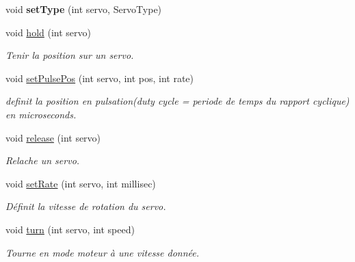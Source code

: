 \begin{DoxyCompactItemize}
\mbox{\label{classServoDriver_a5ca0f58290fa29ae484fe4a5077a1c8e}} 
void {\bfseries set\+Type} (int servo, Servo\+Type)
\item 
\mbox{\label{classServoDriver_af580283b3d1765c9a27276e9a870cf88}} 
void \hyperlink{classServoDriver_af580283b3d1765c9a27276e9a870cf88}{hold} (int servo)
\begin{DoxyCompactList}\small\item\em Tenir la position sur un servo. \end{DoxyCompactList}\item 
\mbox{\label{classServoDriver_a054705e6b04674b45aa9dd39e68a1b1c}} 
void \hyperlink{classServoDriver_a054705e6b04674b45aa9dd39e68a1b1c}{set\+Pulse\+Pos} (int servo, int pos, int rate)
\begin{DoxyCompactList}\small\item\em definit la position en pulsation(duty cycle = periode de temps du rapport cyclique) en microseconds. \end{DoxyCompactList}\item 
\mbox{\label{classServoDriver_aa1040b0db7ed851aec70a122301fe665}} 
void \hyperlink{classServoDriver_aa1040b0db7ed851aec70a122301fe665}{release} (int servo)
\begin{DoxyCompactList}\small\item\em Relache un servo. \end{DoxyCompactList}\item 
\mbox{\label{classServoDriver_a27d45f075f5fb2333937ab253a8cce6c}} 
void \hyperlink{classServoDriver_a27d45f075f5fb2333937ab253a8cce6c}{set\+Rate} (int servo, int millisec)
\begin{DoxyCompactList}\small\item\em Définit la vitesse de rotation du servo. \end{DoxyCompactList}\item 
\mbox{\label{classServoDriver_ad68ebde8a710451c8fea2cd03cfa4bc0}} 
void \hyperlink{classServoDriver_ad68ebde8a710451c8fea2cd03cfa4bc0}{turn} (int servo, int speed)
\begin{DoxyCompactList}\small\item\em Tourne en mode moteur à une vitesse donnée. \end{DoxyCompactList}\item 

\end{DoxyCompactItemize}
